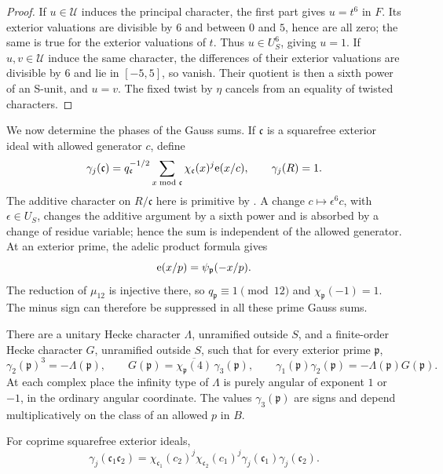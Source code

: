 \begin{proof}
If \(u\in\mathcal U\) induces the principal character, the first part gives
\(u=t^6\) in \(F\).  Its exterior valuations are divisible by \(6\) and
between \(0\) and \(5\), hence are all zero; the same is true for the
exterior valuations of \(t\).  Thus \(u\in U_S^6\), giving \(u=1\).
If \(u,v\in\mathcal U\) induce the same character, the differences of their
exterior valuations are divisible by \(6\) and lie in \([-5,5]\), so vanish.
Their quotient is then a sixth power of an S-unit, and \(u=v\).
The fixed twist by \(\eta\) cancels from an equality of twisted characters.
\end{proof}

We now determine the phases of the Gauss sums.  If \(\mathfrak c\) is a
squarefree exterior ideal with allowed generator \(c\), define
\begin{equation}
 \gamma_j(\mathfrak c)
  =q_{\mathfrak c}^{-1/2}
       \sum_{x\bmod\mathfrak c}\chi_{\mathfrak c}(x)^j\mathrm{e}(x/c),
 \qquad \gamma_j(R)=1.\label{eq:normalized-gauss}
\end{equation}
The additive character on \(R/\mathfrak c\) here is primitive by
.  A change \(c\mapsto\epsilon^6c\), with
\(\epsilon\in U_S\), changes the additive argument by a sixth power and is
absorbed by a change of residue variable; hence the sum is independent of
the allowed generator.  At an exterior prime, the adelic product formula
gives
\[
 \mathrm{e}(x/p)=\psi_{\mathfrak p}(-x/p).
\]
The reduction of \(\mu_{12}\) is injective there, so
\(q_{\mathfrak p}\equiv1\pmod{12}\) and
\(\chi_{\mathfrak p}(-1)=1\).  The minus sign can therefore be suppressed
in all these prime Gauss sums.

\begin{lemma}\label{lem:gauss-characters}
There are a unitary Hecke character \(\Lambda\), unramified outside \(S\),
and a finite-order Hecke character \(G\), unramified outside \(S\), such that
for every exterior prime \(\mathfrak p\),
\begin{equation}
 \gamma_2(\mathfrak p)^3=-\Lambda(\mathfrak p),\qquad
 G(\mathfrak p)=\overline{\chi_{\mathfrak p}(4)}\,
                     \gamma_3(\mathfrak p),\qquad
 \gamma_1(\mathfrak p)\gamma_2(\mathfrak p)
                      =-\Lambda(\mathfrak p)G(\mathfrak p).
\label{eq:gauss-corrections}
\end{equation}
At each complex place the infinity type of \(\Lambda\) is purely angular
of exponent \(1\) or \(-1\), in the ordinary angular coordinate.
The values \(\gamma_3(\mathfrak p)\) are signs and depend multiplicatively
on the class of an allowed \(p\) in \(B\).

For coprime squarefree exterior ideals,
\begin{equation}
 \gamma_j(\mathfrak c_1\mathfrak c_2)
 =\chi_{\mathfrak c_1}(c_2)^j
  \chi_{\mathfrak c_2}(c_1)^j
  \gamma_j(\mathfrak c_1)\gamma_j(\mathfrak c_2).
\label{eq:gauss-crt}
\end{equation}
\end{lemma}

